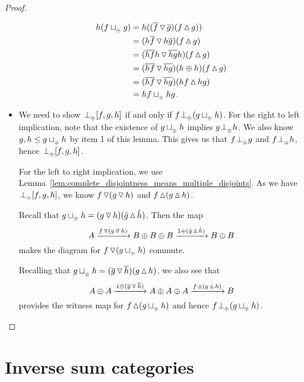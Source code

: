 \begin{proof}
\begin{itemize}
      \begin{align*}
        h (f\tjoin g) &= h ((\rst{f}\tjdown\rst{g})  (f \tjup g))\\
        &= (h\rst{f}\tjdown h\rst{g}) (f \tjup g)\\
        &= (\rst{h f}h\tjdown \rst{h g}h)  (f \tjup g)\\
        &= (\rst{h f}\tjdown \rst{h g})(h\+h)  (f \tjup g)\\
        &= (\rst{h f}\tjdown \rst{h g}) (h f \tjup h g)\\
        &= h f \tjoin h g.
      \end{align*}


    \item [\axiom{DJ}{4}] We need to show $\tperp [f,g,h]$ if and only if $f \tperp (g \tjoin h)$.
      For the right to left implication, note that the existence of $g\tjoin h$ implies $g \tperp
      h$. We also know $g, h \le g\tjoin h$ by item 1 of this lemma. This gives us that $f \tperp
      g$ and $f \tperp h$, hence $\tperp [f,g,h]$.

      For the left to right implication, we use
      Lemma~\ref{lem:complete_disjointness_means_multiple_disjoints}. As we have $\tperp [f,g,h]$,
      we  know $f\tjdown(g\tjdown h)$ and $f\tjup(g\tjup h)$.

      Recall that $g\tjoin h = (g\tjdown h)(\rg{g}\tjup\rg{h})$. Then the map
      \[
        A\xrightarrow{f\tjdown(g\tjdown h)} B\+B\+B\xrightarrow{1\+(\rg{g}\tjup\rg{h})} B\+B
      \]
      makes the diagram for $f \tjdown (g\tjoin h)$ commute.

      Recalling that  $g\tjoin h =
      (\rst{g}\tjdown \rst{h})(g\tjup h)$, we also see that
      \[
        A\+A\xrightarrow{1\+(\rst{g}\tjdown\rst{h})}A\+A\+A\xrightarrow{f\tjup(g\tjup h)}B
      \]
      provides the witness map for $f \tjup(g\tjoin h)$ and hence $f \tperp (g \tjoin h)$.
  \end{itemize}

\end{proof}




\section{Inverse sum categories} %
\label{sec:inverse_sum_categories}

